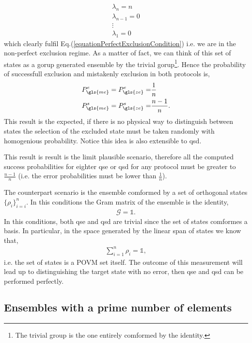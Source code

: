 \documentclass[12pt,letterpaper]{article}
\begin{document}
\begin{multicols}{2}
\begin{align*}
	\lambda_n=n\\
	\lambda_{n-1}=0\\
	\vdots\\
	\lambda_{1}=0
\end{align*}
which clearly fulfil Eq.(\ref{equationPerfectExclusionCondition}) i.e. we are in the non-perfect exclusion regime. As a matter of fact, we can think of this set of states as a gorup generated ensemble by the trivial gorup\footnote{The trivial group is the one entirely comformed by the identity.}. Hence the probability of successfull exclusion and mistakenly exclusion in both protocols is,
\begin{align*}
	P_{\gls{me}}^e=P_{\gls{ze}}^e=&\frac{1}{n}\\
	P_{\gls{me}}^s=P_{\gls{ze}}^s=&\frac{n-1}{n}.
\end{align*}
This result is the expected, if there is no physical way to distinguish between states the selection of the excluded state must be taken randomly with homogenious probability. Notice this idea is also extensible to \gls{qsd}.

This result is result is the limit plausible scenario, therefore all the computed success probabilities for eighter \gls{qse} or \gls{qsd} for any protocol must be greater to $\frac{n-1}{n}$ (i.e. the error probabilities must be lower than $\frac{1}{n}$).

The counterpart scenario is the ensemble comformed by a set of orthogonal states $\{\rho_i\}_{i=i}^{n}$. In this conditions the Gram matrix of the ensemble is the identity,
\begin{align*}
	\mathcal{G}=\mathds{1}.
\end{align*}
In this conditions, both \gls{qse} and \gls{qsd} are trivial since the set of states comformes a basis. In particular, in the space generated by the linear span of states we know that,
\begin{align*}
	\sum_{i=1}^{n}\rho_i=\mathds{1},
\end{align*}
i.e. the set of states is a POVM set itself. The outcome of this measurement will lead up to distinguishing the target state with no error, then \gls{qse} and \gls{qsd} can be performed perfectly.

\subsection{Ensembles with a prime number of elements}\label{sectionEnsemblesWithPrime}


\end{multicols}
\end{document}
